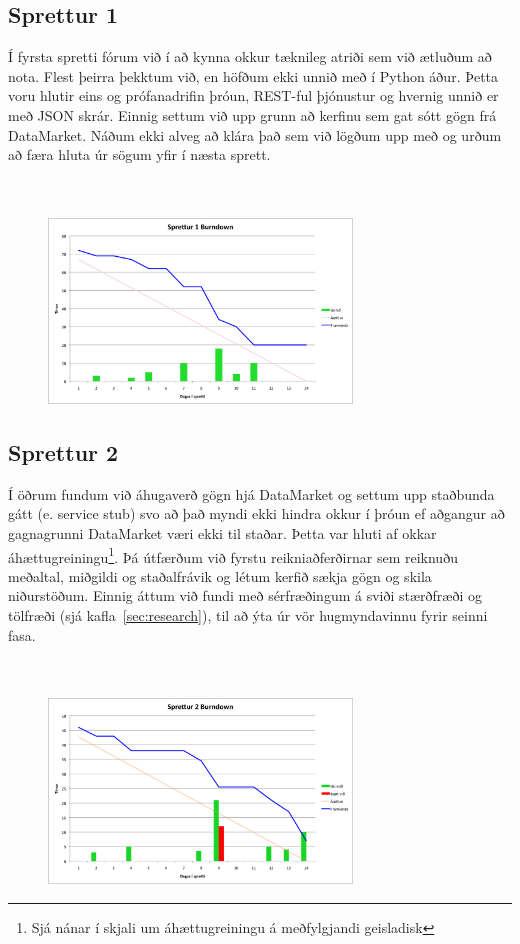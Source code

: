 \documentclass{article}
\begin{document}
\subsection{Sprettur 1}
Í fyrsta spretti fórum við í að kynna okkur tæknileg atriði sem við ætluðum að
nota.
Flest þeirra þekktum við, en höfðum ekki unnið með í Python áður. Þetta voru hlutir
eins og prófanadrifin þróun, REST-ful þjónustur og hvernig 
unnið er með JSON skrár. Einnig settum við upp grunn að kerfinu sem gat sótt
gögn frá DataMarket. Náðum ekki alveg að klára það sem við lögðum 
upp með og urðum að færa hluta úr sögum yfir í næsta sprett.
\hfil \\
\hfil \\
\hfil \\
\begin{figure}[H]
  \centering
  \includegraphics[width=0.72\textwidth]{Sprettur1_Burndown.png}
  \caption{}
  \label{fig:sp1}
\end{figure}
\newpage
\subsection{Sprettur 2}
Í öðrum fundum við áhugaverð gögn hjá DataMarket og settum upp staðbunda
gátt (e. service stub) svo að það myndi ekki hindra okkur í þróun ef 
aðgangur að gagnagrunni DataMarket væri ekki til staðar. Þetta var hluti af
okkar áhættugreiningu\footnote[1]{Sjá nánar í skjali um áhættugreiningu á meðfylgjandi geisladisk}. 
Þá útfærðum við fyrstu reikniaðferðirnar sem reiknuðu meðaltal, miðgildi og staðalfrávik
og létum kerfið sækja gögn og skila niðurstöðum.
Einnig áttum við fundi með sérfræðingum á sviði stærðfræði og tölfræði (sjá kafla~\ref{sec:research}), til að ýta
úr vör hugmyndavinnu fyrir seinni fasa.
\hfil \\
\hfil \\
\hfil \\
\begin{figure}[H]
 \centering
 \includegraphics[width=0.72\textwidth]{Sprettur2_Burndown.png}
 \caption{}
\end{figure}
\label{fig:sp2}
\newpage
\end{document}
